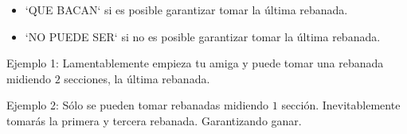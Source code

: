 \outputText

\begin{itemize}
    \item `QUE BACAN` si es posible garantizar tomar la última rebanada.
    \item `NO PUEDE SER` si no es posible garantizar tomar la última rebanada.
\end{itemize}

\exampleCases

\begin{example}
\end{example}

\explanationText

Ejemplo 1: Lamentablemente empieza tu amiga y puede tomar una rebanada midiendo $2$ secciones, la última rebanada.

Ejemplo 2: Sólo se pueden tomar rebanadas midiendo $1$ sección. Inevitablemente tomarás la primera y tercera rebanada. Garantizando ganar.
